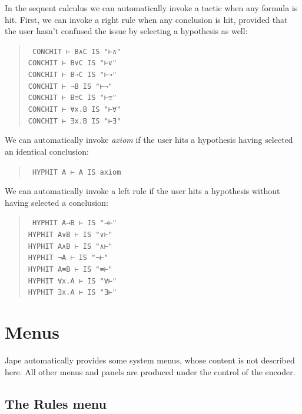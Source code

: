 In the sequent calculus we can automatically invoke a tactic when any formula is hit. First, we can invoke a right rule when any conclusion is hit, provided that the user hasn't confused the issue by selecting a hypothesis as well:
\begin{quote}\tt\small
CONCHIT ⊢ B∧C   IS "⊢∧"\\
CONCHIT ⊢ B∨C   IS "⊢∨"      \\
CONCHIT ⊢ B→C   IS "⊢→"\\
CONCHIT ⊢ ¬B        IS "⊢¬"       \\
CONCHIT ⊢ B≡C   IS "⊢≡"     \\
CONCHIT ⊢ ∀x.B  IS "⊢∀"  \\
CONCHIT ⊢ ∃x.B  IS "⊢∃"  
\end{quote}

We can automatically invoke \textit{axiom} if the user hits a hypothesis having selected an identical conclusion:
\begin{quote}\tt\small
HYPHIT  A ⊢ A   IS axiom       
\end{quote}

We can automatically invoke a left rule if the user hits a hypothesis without having selected a conclusion:
\begin{quote}\tt\small
HYPHIT  A→B ⊢   IS "→⊢"        \\
HYPHIT  A∨B ⊢   IS "∨⊢"\\
HYPHIT  A∧B ⊢   IS "∧⊢"    \\
HYPHIT  ¬A ⊢        IS "¬⊢"    \\
HYPHIT  A≡B ⊢   IS "≡⊢"    \\
HYPHIT  ∀x.A ⊢  IS "∀⊢"\\
HYPHIT  ∃x.A ⊢  IS "∃⊢"
\end{quote}

\section{Menus}

Jape automatically provides some system menus, whose content is not described here. All other menus and panels are produced under the control of the encoder.

\subsection{The Rules menu}


